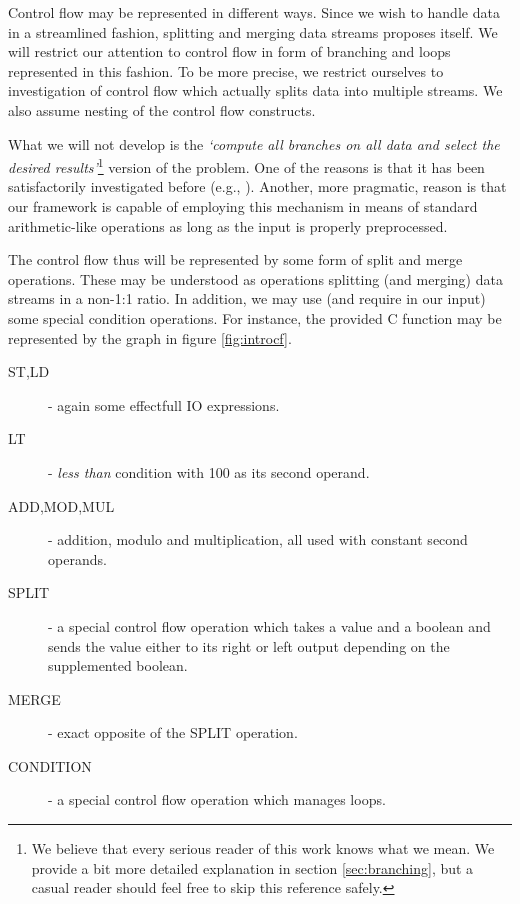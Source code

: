 Control flow may be represented in different ways. Since we wish to handle data in a streamlined fashion, splitting and merging data streams proposes itself. We will restrict our attention to control flow in form of branching and loops represented in this fashion. To be more precise, we restrict ourselves to investigation of control flow which actually splits data into multiple streams. We also assume nesting of the control flow constructs.

\begin{rem}
  What we will not develop is the \emph{`compute all branches on all data and select the desired results'}\footnote{We believe that every serious reader of this work knows what we mean. We provide a bit more detailed explanation in section \ref{sec:branching}, but a casual reader should feel free to skip this reference safely.} version of the problem. One of the reasons is that it has been satisfactorily investigated before (e.g., \cite{who_knows}). Another, more pragmatic, reason is that our framework is capable of employing this mechanism in means of standard arithmetic-like operations as long as the input is properly preprocessed.
\end{rem}


The control flow thus will be represented by some form of split and merge operations. These may be understood as operations splitting (and merging) data streams in a non-1:1 ratio. In addition, we may use (and require in our input) some special condition operations. For instance, the provided C function may be represented by the graph in figure \ref{fig:introcf}.


\begin{description}
  \item[ST,LD] - again some effectfull IO expressions.
  \item[LT] - \emph{less than} condition with 100 as its second operand.
  \item[ADD,MOD,MUL] - addition, modulo and multiplication, all used with constant second operands.
  \item[SPLIT] - a special control flow operation which takes a value and a boolean and sends the value either to its right or left output depending on the supplemented boolean.
  \item[MERGE] - exact opposite of the SPLIT operation.
  \item[CONDITION] - a special control flow operation which manages loops. 
\end{description}

